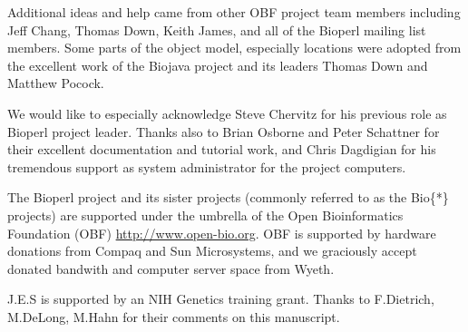 \documentclass[12pt]{article}
\begin{document}
Additional ideas and help came from other OBF project team members
including Jeff Chang, Thomas Down, Keith James, and all of the Bioperl
mailing list members.  Some parts of the object model, especially
locations were adopted from the excellent work of the Biojava project
and its leaders Thomas Down and Matthew Pocock.

We would like to especially acknowledge Steve Chervitz for his
previous role as Bioperl project leader.  Thanks also to Brian Osborne
and Peter Schattner for their excellent documentation and tutorial
work, and Chris Dagdigian for his tremendous support as system
administrator for the project computers.

The Bioperl project and its sister projects (commonly referred to as
the Bio\{*\} projects) are supported under the umbrella of the Open
Bioinformatics Foundation (OBF) \url{http://www.open-bio.org}.
OBF is supported by hardware donations from Compaq and Sun
Microsystems, and we graciously accept donated bandwith and computer
server space from Wyeth.

J.E.S is supported by an NIH Genetics training grant.  Thanks to
F.Dietrich, M.DeLong, M.Hahn for their comments on this manuscript.


 

\newpage
\end{document}
